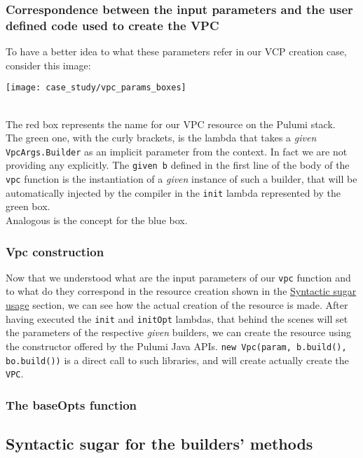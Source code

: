 \subsubsection{Correspondence between the input parameters and the user defined code used to create the VPC}
To have a better idea to what these parameters refer in our VCP creation case, consider this image:
\begin{center}
  \texttt{[image: case\_study/vpc\_params\_boxes]} 
\end{center}\mbox{}\\
The red box represents the name for our VPC resource on the Pulumi stack.\\
The green one, with the curly brackets, is the lambda that takes a \textit{given} \texttt{VpcArgs.Builder} as an implicit parameter from the context.
In fact we are not providing any explicitly.
The \texttt{given b} defined in the first line of the body of the \texttt{vpc} function is the instantiation of a \textit{given} instance of such a builder, that will be automatically injected by the compiler in the \texttt{init} lambda represented by the green box.\\
Analogous is the concept for the blue box.\\

\subsubsection{Vpc construction}
Now that we understood what are the input parameters of our \texttt{vpc} function and to what do they correspond in the resource creation shown in the \hyperref[ssec:syn-sug-usage]{Syntactic sugar usage} section, we can see how the actual creation of the resource is made.
After having executed the \texttt{init} and \texttt{initOpt} lambdas, that behind the scenes will set the parameters of the respective \textit{given} builders, we can create the resource using the constructor offered by the Pulumi Java APIs.
\texttt{new Vpc(param, b.build(), bo.build())} is a direct call to such libraries, and will create actually create the \texttt{VPC}.

\subsubsection{The baseOpts function}






\subsection{Syntactic sugar for the builders' methods}
\label{ssec:syn-sug-builders}

